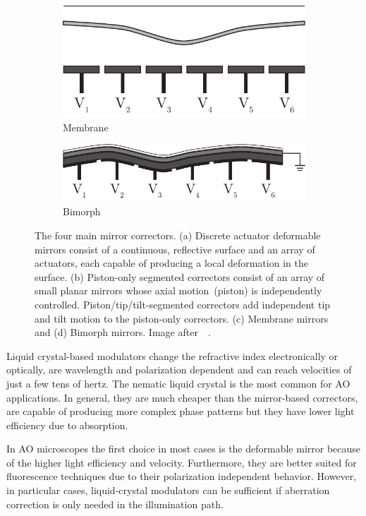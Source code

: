 \begin{figure}[tbh]
			\begin{subfigure}[b]{0.25\textwidth}
							\includegraphics[width=\textwidth]{images/deformable_membrane}
							\caption{Membrane}
							\label{fig:Correctors_membrane}
			\end{subfigure}
			\quad
			\begin{subfigure}[b]{0.25\textwidth}
							\includegraphics[width=\textwidth]{images/deformable_bimorph}
							\caption{Bimorph}
							\label{fig:Correctors_bimorph}
			\end{subfigure}							
			\caption{The four main mirror correctors. (a) Discrete actuator deformable mirrors consist of a continuous, reflective surface and an array of actuators, each capable of producing a local deformation in the surface. (b) Piston-only segmented correctors consist of an array of small planar mirrors whose axial motion~(piston) is independently controlled. Piston/tip/tilt-segmented correctors add independent tip and tilt motion to the piston-only correctors. (c) Membrane mirrors and (d) Bimorph mirrors. Image after~~\cite{AO_vision_science}.}
	\label{fig:Correctors}
\end{figure} 


Liquid crystal-based modulators change the refractive index electronically or optically, are wavelength and polarization dependent and can reach velocities of just a few tens of hertz. The nematic liquid crystal is the most common for AO applications. In general, they are much cheaper than the mirror-based correctors, are capable of producing more complex phase patterns but they have lower light efficiency due to absorption.   

In AO microscopes the first choice in most cases is the deformable mirror because of the higher light efficiency and velocity. Furthermore, they are better suited for fluorescence techniques due to their polarization independent behavior. However, in particular cases, liquid-crystal modulators can be sufficient if aberration correction is only needed in the illumination path.
